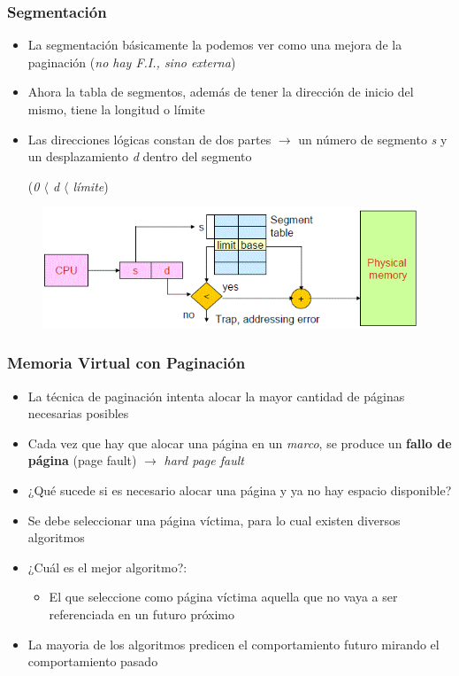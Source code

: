 \begin{frame}
  \frametitle{\textbf{Segmentación}}
  \begin{itemize}
  	\item La segmentación básicamente la podemos ver como una mejora de la paginación (\emph{no hay F.I., sino externa})  	
	\item Ahora la tabla de segmentos, además de tener la dirección de inicio del mismo, tiene la longitud o límite
	\item Las direcciones lógicas constan de dos partes $\rightarrow$ un número de segmento \emph{s} y un desplazamiento \emph{d} dentro del segmento 

	(\emph{0 $\langle$ d $\langle$ límite})
  \end{itemize}
  \begin{figure}
    \includegraphics[scale=0.3]{images/segmentation.png}
  \end{figure}  
\end{frame}

\begin{frame}
  \frametitle{\textbf{Memoria Virtual} con Paginación}
  \begin{itemize}
  	\item La técnica de paginación intenta alocar la mayor cantidad de páginas necesarias posibles
	\item Cada vez que hay que alocar una página en un \emph{marco}, se produce un \textbf{fallo de página} (page fault) $\rightarrow$ \emph{hard page fault}
	\item ¿Qué sucede si es necesario alocar una página y ya no hay espacio disponible?
	\pause
	\item Se debe seleccionar una página víctima, para lo cual existen diversos algoritmos
	\item ¿Cuál es el mejor algoritmo?:
	\pause
	\begin{itemize}
		\item El que seleccione como página víctima aquella que no vaya a ser referenciada en un futuro próximo
	\end{itemize}
	\item La mayoria de los algoritmos predicen el comportamiento futuro mirando el comportamiento pasado
  \end{itemize}  
\end{frame}

